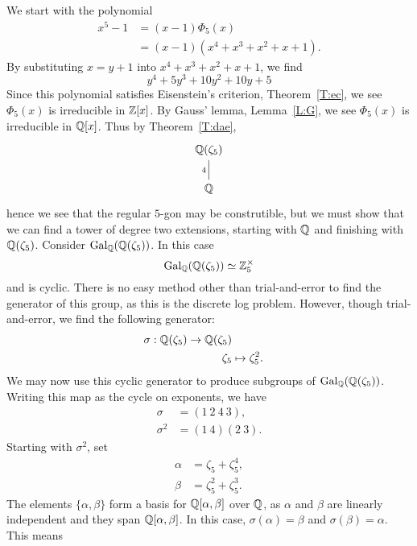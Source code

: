 \documentclass{ximera}
\begin{document}
\begin{example}
  We start with the polynomial
  \begin{align*}
    x^{5} -1 &= (x-1) \Phi_{5}(x)\\
    &= (x-1)(x^{4} + x^{3} + x^2 + x+1).
  \end{align*}
  By substituting $x=y+1$ into $x^{4} + x^3 +x^2 + x+1$, we find
  \[
  y^{4} +5y^3+10y^2+10y+5
  \]
  Since this polynomial satisfies Eisenstein's criterion,
  Theorem~\ref{T:ec}, we see $\Phi_5(x)$ is irreducible in $\mathbb Z[x]$. By
  Gauss' lemma, Lemma~\ref{L:G}, we see $\Phi_5(x)$ is irreducible in
  $\mathbb Q[x]$. Thus by Theorem~\ref{T:dae}, 
  \[
  \begin{tikzcd}
    \Q(\zeta_{5})\\
    \Q\ar[u, -, "4"]
  \end{tikzcd}
  \]
  hence we see that the regular $5$-gon may be construtible, but we
  must show that we can find a tower of degree two extensions,
  starting with $\mathbb Q$ and finishing with $\mathbb Q(\zeta_{5})$.  Consider
  $\operatorname{Gal}_{\mathbb Q}(\mathbb Q(\zeta_{5}))$. In this case
  \[
  \operatorname{Gal}_{\mathbb Q}(\mathbb Q(\zeta_{5}))\simeq \mathbb Z_{5}^\times
  \]
  and is cyclic. There is no easy method other than trial-and-error to
  find the generator of this group, as this is the discrete log
  problem. However, though
  trial-and-error, we find the following generator:
  \begin{align*}
    \sigma:\mathbb Q(\zeta_{5}) \to\mathbb Q(\zeta_{5})\\
    \zeta_{5} &\mapsto \zeta_{5}^2.
  \end{align*}
  We may now use this cyclic generator to produce subgroups of
  $\operatorname{Gal}_{\mathbb Q}(\mathbb Q(\zeta_{5}))$.  Writing this map as the cycle on
  exponents, we have
  \begin{align*}
    \sigma &= (1\ 2\ 4\ 3),\\
    \sigma^2 &= (1\ 4)(2\ 3).
  \end{align*}
  Starting with $\sigma^2$, set
  \begin{align*}
    \alpha &= \zeta_{5}   + \zeta_{5}^4,\\
    \beta &= \zeta_{5}^2 + \zeta_{5}^{3}.
  \end{align*}
  The elements $\{\alpha,\beta\}$ form a basis for $\mathbb Q[\alpha,\beta]$ over
  $\mathbb Q$, as $\alpha$ and $\beta$ are linearly independent and they span
  $\mathbb Q[\alpha,\beta]$. In this case, $\sigma(\alpha) = \beta$ and
  $\sigma(\beta) = \alpha$. This means
  \begin{align*}

\end{align*}
\end{example}
\end{document}
